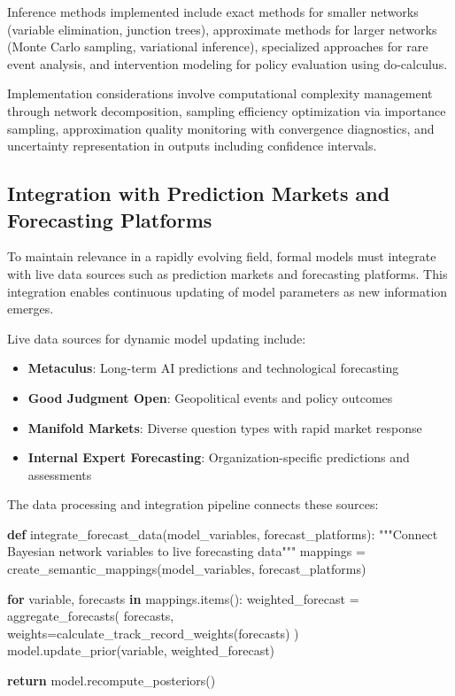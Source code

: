 \documentclass[
  11pt,
  letterpaper,
]{book}
\newenvironment{Shaded}{\begin{snugshade}}{\end{snugshade}}
\newcommand{\CommentTok}[1]{\textcolor[rgb]{0.37,0.37,0.37}{#1}}
\newcommand{\ControlFlowTok}[1]{\textcolor[rgb]{0.00,0.23,0.31}{\textbf{#1}}}
\newcommand{\KeywordTok}[1]{\textcolor[rgb]{0.00,0.23,0.31}{\textbf{#1}}}
\newcommand{\NormalTok}[1]{\textcolor[rgb]{0.00,0.23,0.31}{#1}}
\newcommand{\OperatorTok}[1]{\textcolor[rgb]{0.37,0.37,0.37}{#1}}
\providecommand{\tightlist}{%
  \setlength{\itemsep}{0pt}\setlength{\parskip}{0pt}}
\begin{document}
Inference methods implemented include exact methods for smaller networks
(variable elimination, junction trees), approximate methods for larger
networks (Monte Carlo sampling, variational inference), specialized
approaches for rare event analysis, and intervention modeling for policy
evaluation using do-calculus.

Implementation considerations involve computational complexity
management through network decomposition, sampling efficiency
optimization via importance sampling, approximation quality monitoring
with convergence diagnostics, and uncertainty representation in outputs
including confidence intervals.

\subsection{Integration with Prediction Markets and Forecasting
Platforms}\label{sec-prediction-markets}

To maintain relevance in a rapidly evolving field, formal models must
integrate with live data sources such as prediction markets and
forecasting platforms. This integration enables continuous updating of
model parameters as new information emerges.

Live data sources for dynamic model updating include:

\begin{itemize}
\tightlist
\item
  \textbf{Metaculus}: Long-term AI predictions and technological
  forecasting
\item
  \textbf{Good Judgment Open}: Geopolitical events and policy outcomes
\item
  \textbf{Manifold Markets}: Diverse question types with rapid market
  response
\item
  \textbf{Internal Expert Forecasting}: Organization-specific
  predictions and assessments
\end{itemize}

The data processing and integration pipeline connects these sources:

\begin{Shaded}
\begin{Highlighting}[]
\KeywordTok{def}\NormalTok{ integrate\_forecast\_data(model\_variables, forecast\_platforms):}
    \CommentTok{"""Connect Bayesian network variables to live forecasting data"""}
\NormalTok{    mappings }\OperatorTok{=}\NormalTok{ create\_semantic\_mappings(model\_variables, forecast\_platforms)}
    
    \ControlFlowTok{for}\NormalTok{ variable, forecasts }\KeywordTok{in}\NormalTok{ mappings.items():}
\NormalTok{        weighted\_forecast }\OperatorTok{=}\NormalTok{ aggregate\_forecasts(}
\NormalTok{            forecasts, }
\NormalTok{            weights}\OperatorTok{=}\NormalTok{calculate\_track\_record\_weights(forecasts)}
\NormalTok{        )}
\NormalTok{        model.update\_prior(variable, weighted\_forecast)}
    
    \ControlFlowTok{return}\NormalTok{ model.recompute\_posteriors()}
\end{Highlighting}
\end{Shaded}
\end{document}
